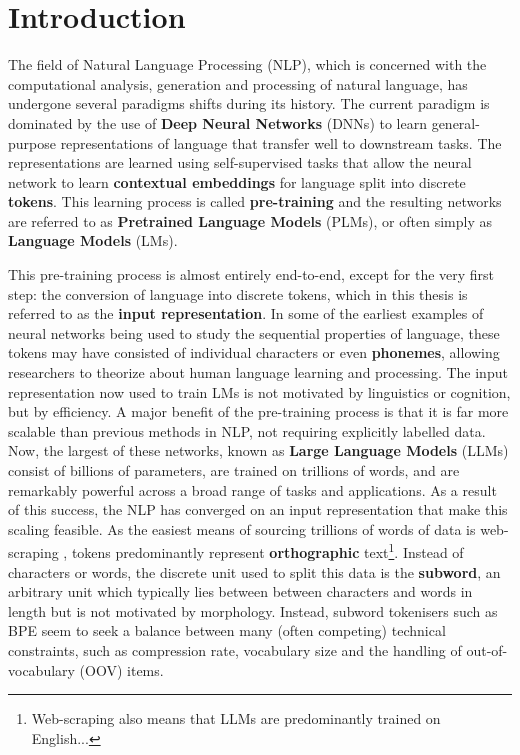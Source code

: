 \chapter{Introduction}

The field of Natural Language Processing (NLP), which is concerned with the computational analysis, generation and processing of natural language, has undergone several paradigms shifts during its history. The current paradigm is dominated by the use of \textbf{Deep Neural Networks} (DNNs) to learn general-purpose representations of language that transfer well to downstream tasks. The representations are learned using self-supervised tasks that allow the neural network to learn \textbf{contextual embeddings} for language split into discrete \textbf{tokens}. This learning process is called \textbf{pre-training} and the resulting networks are referred to as \textbf{Pretrained Language Models} (PLMs), or often simply as \textbf{Language Models} (LMs). 

This pre-training process is almost entirely end-to-end, except for the very first step: the conversion of language into discrete tokens, which in this thesis is referred to as the \textbf{input representation}. In some of the earliest examples of neural networks being used to study the sequential properties of language, these tokens may have consisted of individual characters or even \textbf{phonemes}, allowing researchers to theorize about human language learning and processing. The input representation now used to train LMs is not motivated by linguistics or cognition, but by efficiency. A major benefit of the pre-training process is that it is far more scalable than previous methods in NLP, not requiring explicitly labelled data. Now, the largest of these networks, known as \textbf{Large Language Models} (LLMs) consist of billions of parameters, are trained on trillions of words, and are remarkably powerful across a broad range of tasks and applications. As a result of this success, the NLP has converged on an input representation that make this scaling feasible. As the easiest means of sourcing trillions of words of data is web-scraping \addcites, tokens predominantly represent \textbf{orthographic} text\footnote{Web-scraping also means that LLMs are predominantly trained on English...}. Instead of characters or words, the discrete unit used to split this data is the \textbf{subword}, an arbitrary unit which typically lies between between characters and words in length but is not motivated by morphology. Instead, subword tokenisers such as BPE seem to seek a balance between many (often competing) technical constraints, such as compression rate, vocabulary size and the handling of out-of-vocabulary (OOV) items.

